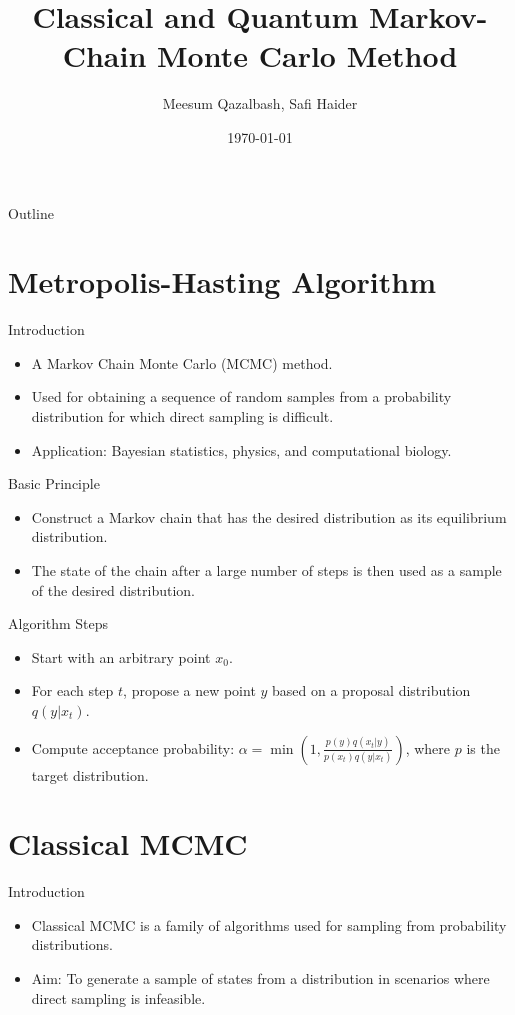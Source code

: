 \documentclass[
    10pt,
    aspectratio=169,
]{beamer}
\title{
    Classical and Quantum Markov-Chain Monte Carlo Method}
\author{Meesum Qazalbash, Safi Haider}
\date[\today] %
{\today}
\begin{document}
\maketitle

\begin{frame}{Outline}
    \tableofcontents
\end{frame}

\section{Metropolis-Hasting Algorithm}
\begin{frame}{Introduction}
    \begin{itemize}
        \item A Markov Chain Monte Carlo (MCMC) method.
        \item Used for obtaining a sequence of random samples from a probability distribution for which direct sampling is difficult.
        \item Application: Bayesian statistics, physics, and computational biology.
    \end{itemize}
\end{frame}

\begin{frame}{Basic Principle}
    \begin{itemize}
        \item Construct a Markov chain that has the desired distribution as its equilibrium distribution.
        \item The state of the chain after a large number of steps is then used as a sample of the desired distribution.
    \end{itemize}
\end{frame}

\begin{frame}{Algorithm Steps}
    \begin{itemize}
        \item Start with an arbitrary point \(x_0\).
        \item For each step \(t\), propose a new point \(y\) based on a proposal distribution \(q(y|x_t)\).
        \item Compute acceptance probability: \(\alpha = \min\left(1, \frac{p(y)q(x_t|y)}{p(x_t)q(y|x_t)}\right)\), where \(p\) is the target distribution.
    \end{itemize}
\end{frame}

\section{Classical MCMC}
\begin{frame}{Introduction}
    \begin{itemize}
        \item Classical MCMC is a family of algorithms used for sampling from probability distributions.
        \item Aim: To generate a sample of states from a distribution in scenarios where direct sampling is infeasible.
    \end{itemize}
\end{frame}
\end{document}

